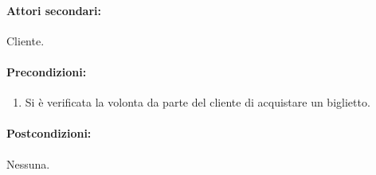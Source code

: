 \documentclass{article}
\begin{document}
	\paragraph{Attori secondari:}Cliente.
	
	\paragraph{Precondizioni:} 
		\begin{enumerate}[itemsep=8pt,parsep=0pt]
			\item Si è verificata la volonta da parte del cliente di acquistare un biglietto.
		\end{enumerate}

	
	\paragraph{Postcondizioni:}Nessuna.
	
\end{document}
